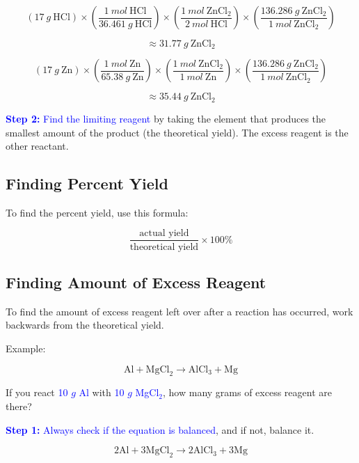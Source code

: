 \documentclass[a4paper, 12pt]{article}
\begin{document}
$$(17 \: g \: \text{HCl}) \times \left(\frac{1 \: mol \: \text{HCl}}{36.461 \: g \: \text{HCl}}\right) \times \left(\frac{1 \: mol \: \text{ZnCl}_2}{2 \: mol \: \text{HCl}}\right) \times \left(\frac{136.286 \: g \: \text{ZnCl}_2}{1 \: mol \: \text{ZnCl}_2}\right)$$

$$ \approx 31.77 \: g \: \text{ZnCl}_2$$

$$(17 \: g \: \text{Zn}) \times \left(\frac{1 \: mol \: \text{Zn}}{65.38 \: g \: \text{Zn}}\right) \times \left(\frac{1 \: mol \: \text{ZnCl}_2}{1 \: mol \: \text{Zn}}\right) \times \left(\frac{136.286 \: g \: \text{ZnCl}_2}{1 \: mol \: \text{ZnCl}_2}\right)$$

$$ \approx 35.44 \: g \: \text{ZnCl}_2$$

\textcolor{blue}{\textbf{Step 2:} Find the limiting reagent} by taking the element that produces the smallest amount of the product (the theoretical yield). The excess reagent is the other reactant.


\subsection*{Finding Percent Yield}
To find the percent yield, use this formula:

$$\frac{\text{actual yield}}{\text{theoretical yield}} \times 100\%$$

\subsection*{Finding Amount of Excess Reagent}
To find the amount of excess reagent left over after a reaction has occurred, work backwards from the theoretical yield.

Example:

$$\text{Al} + \text{MgCl}_2 \longrightarrow \text{AlCl}_3 + \text{Mg}$$

If you react \textcolor{blue}{10 $g$ Al} with \textcolor{blue}{10 $g$ MgCl$_2$}, how many grams of excess reagent are there?

\textcolor{blue}{\textbf{Step 1:} Always check if the equation is balanced}, and if not, balance it.

$$\text{2Al} + \text{3MgCl}_2 \longrightarrow \text{2AlCl}_3 + \text{3Mg}$$
\end{document}
